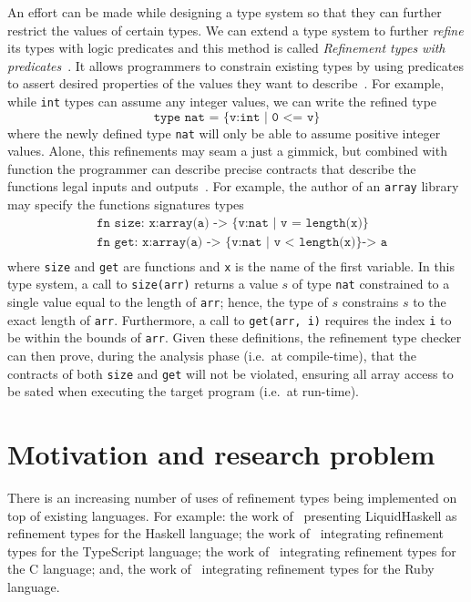 \documentclass[
  oneside,
  english,
  coorientadorbanca,
  noabntexcite
]{ufsc-thesis-rn46-2019}
\newcommand{\code}[1]{\texttt{#1}}
\begin{document}
An effort can be made while designing a type system so that they can further restrict the values of certain types.
We can extend a type system to further \textit{refine} its types with logic predicates and this method is called \textit{Refinement types with predicates}~\cite{jhala2020tutorial}.
It allows programmers to constrain existing types by using predicates to assert desired properties of the values they want to describe~\cite{jhala2020tutorial}.
For example, while \code{int} types can assume any integer values, we can write the refined type
\begin{equation*}
  \code{type nat = \{v:int | 0 <= v\}}
\end{equation*}
where the newly defined type \code{nat} will only be able to assume positive integer values.
Alone, this refinements may seam a just a gimmick, but combined with function the programmer can describe precise contracts that describe the functions legal inputs and outputs~\cite{jhala2020tutorial}.
For example, the author of an \code{array} library may specify the functions signatures types
\begin{equation*}
  \begin{aligned}
     & \code{fn size: x:array(a) -> \{v:nat | v = length(x)\}}      \\
     & \code{fn  get: x:array(a) -> \{v:nat | v < length(x)\} -> a} \\
  \end{aligned}
\end{equation*}
where \code{size} and \code{get} are functions and \code{x} is the name of the first variable.
In this type system, a call to \code{size(arr)} returns a value $s$ of type \code{nat} constrained to a single value equal to the length of \code{arr}; hence, the type of $s$ constrains $s$ to the exact length of \code{arr}.
Furthermore, a call to \code{get(arr, i)} requires the index \code{i} to be within the bounds of \code{arr}.
Given these definitions, the refinement type checker can then prove, during the analysis phase (i.e.\ at compile-time), that the contracts of both \code{size} and \code{get} will not be violated, ensuring all array access to be sated when executing the target program (i.e.\ at run-time).

\section{Motivation and research problem}

There is an increasing number of uses of refinement types being implemented on top of existing languages.
For example: the work of~\textcite{vazou2014liquidhaskell} presenting LiquidHaskell as refinement types for the Haskell language; the work of~\textcite{vekris2016refinementtypescript} integrating refinement types for the TypeScript language; the work of~\textcite{sammler2021refinedc} integrating refinement types for the C language; and, the work of~\textcite{vazou2018refinementruby} integrating refinement types for the Ruby language.
\end{document}
